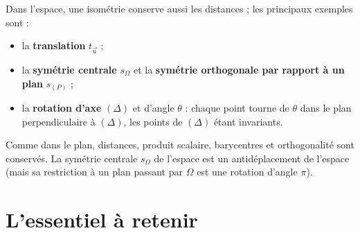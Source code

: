 \begin{propriete}
Dans l'espace, une isométrie conserve aussi les distances ; les principaux exemples sont :
\begin{itemize}
\item la \textbf{translation} $t_{\vec u}$ ;
\item la \textbf{symétrie centrale} $s_\Omega$ et la \textbf{symétrie orthogonale par rapport à un plan} $s_{(P)}$ ;
\item la \textbf{rotation d'axe} $(\Delta)$ et d'angle $\theta$ : chaque point tourne de $\theta$ dans le plan perpendiculaire à $(\Delta)$, les points de $(\Delta)$ étant invariants.
\end{itemize}
Comme dans le plan, distances, produit scalaire, barycentres et orthogonalité sont conservés. La symétrie centrale $s_\Omega$ de l'espace est un antidéplacement de l'espace (mais sa restriction à un plan passant par $\Omega$ est une rotation d'angle $\pi$).
\end{propriete}

\section{L'essentiel à retenir}

